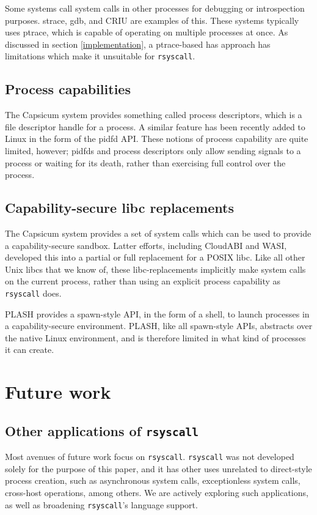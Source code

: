 \documentclass[letterpaper,twocolumn,10pt]{article}
\begin{document}
Some systems call system calls in other processes for debugging or introspection purposes.
strace, gdb, and CRIU\cite{criu} are examples of this.
These systems typically uses ptrace,
which is capable of operating on multiple processes at once.
As discussed in section \ref{implementation},
a ptrace-based has approach has limitations which make it unsuitable for \texttt{rsyscall}.
\subsection{Process capabilities}
The Capsicum system provides something called process descriptors\cite{capsicum},
which is a file descriptor handle for a process.
A similar feature has been recently added to Linux in the form of the pidfd API\cite{pidfd}.
These notions of process capability are quite limited, however;
pidfds and process descriptors only allow sending signals to a process or waiting for its death,
rather than exercising full control over the process.
\subsection{Capability-secure libc replacements}
The Capsicum system provides a set of system calls
which can be used to provide a capability-secure sandbox.\cite{capsicum}
Latter efforts\cite{oblivious}, including CloudABI\cite{cloudabi} and WASI\cite{wasi},
developed this into a partial or full replacement for a POSIX libc.
Like all other Unix libcs that we know of,
these libc-replacements implicitly make system calls on the current process,
rather than using an explicit process capability as \texttt{rsyscall} does.

PLASH provides a spawn-style API, in the form of a shell,
to launch processes in a capability-secure environment.\cite{plash}
PLASH, like all spawn-style APIs, abstracts over the native Linux environment,
and is therefore limited in what kind of processes it can create.
\section{Future work}\label{future_work}
\subsection{Other applications of \texttt{rsyscall}}
Most avenues of future work focus on \texttt{rsyscall}.
\texttt{rsyscall} was not developed solely for the purpose of this paper,
and it has other uses unrelated to direct-style process creation,
such as asynchronous system calls, exceptionless system calls\cite{flexsc}, cross-host operations, among others.
We are actively exploring such applications,
as well as broadening \texttt{rsyscall}'s language support.
\end{document}
